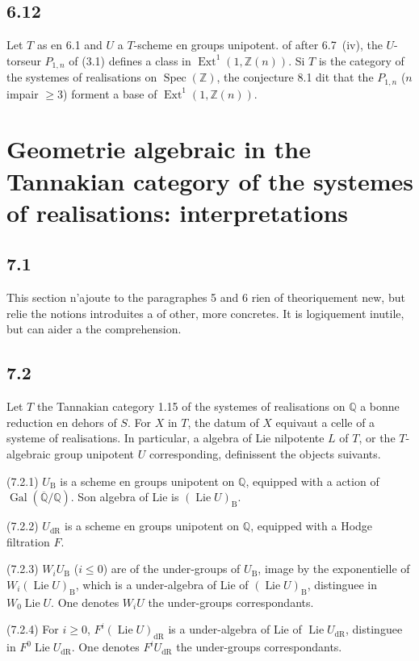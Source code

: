 \documentclass[12pt,a4paper]{article}
\theoremstyle{plain}
\theoremstyle{definition}
\theoremstyle{remark}
\DeclareMathOperator{\Spec}{Spec}
\DeclareMathOperator{\Gal}{Gal}
\DeclareMathOperator{\Ext}{Ext}
\DeclareMathOperator{\Lie}{Lie}
\newcommand{\DR}{\mathrm{dR}}
\newcommand{\B}{\mathrm{B}}
\newcommand{\Z}{\mathbb{Z}}
\newcommand{\Q}{\mathbb{Q}}
\begin{document}
\subsection*{6.12}
Let $T$ as en 6.1 and $U$ a $T$-scheme en groups unipotent. of after 6.7~(iv), the $U$-torseur $P_{1,n}$ of (3.1) defines a class in $\Ext^1(1, 
\Z(n))$. Si $T$ is the category of the systemes of realisations on $\Spec(\Z)$, the conjecture 8.1 dit that the $P_{1,n}$ ($n$ impair $\geq 3$) forment a base of $\Ext^1(1, 
\Z(n))$.

\section{Geometrie algebraic in the Tannakian category of the systemes of realisations: interpretations}
\label{sec:7}

\subsection*{7.1}
This section n'ajoute to the paragraphes 5 and 6 rien of theoriquement new, but relie the notions introduites a of other, more concretes. It is logiquement inutile, but can aider a the comprehension.

\subsection*{7.2}
Let $T$ the Tannakian category 1.15 of the systemes of realisations on $\Q$ a bonne reduction en dehors of $S$. For $X$ in $T$, the datum of $X$ equivaut a celle of a systeme of realisations. In particular, a algebra of Lie nilpotente $L$ of $T$, or the $T$-algebraic group unipotent $U$ corresponding, definissent the objects suivants.

(7.2.1) $U_\B$ is a scheme en groups unipotent on $\Q$, equipped with a action of $\Gal(\overline{\Q}/\Q)$. Son algebra of Lie is $(\Lie U)_\B$.

(7.2.2) $U_\DR$ is a scheme en groups unipotent on $\Q$, equipped with a Hodge filtration $F$.

(7.2.3) $W_i U_\B$ ($i 
\leq 0$) are of the under-groups of $U_\B$, image by the exponentielle of $W_i(\Lie U)_\B$, which is a under-algebra of Lie of $(\Lie U)_\B$, distinguee in $W_0 
\Lie U$. One denotes $W_i U$ the under-groups correspondants.

(7.2.4) For $i 
\geq 0$, $F^i(\Lie U)_\DR$ is a under-algebra of Lie of $\Lie U_\DR$, distinguee in $F^0 
\Lie U_\DR$. One denotes $F^i U_\DR$ the under-groups correspondants.
\end{document}
